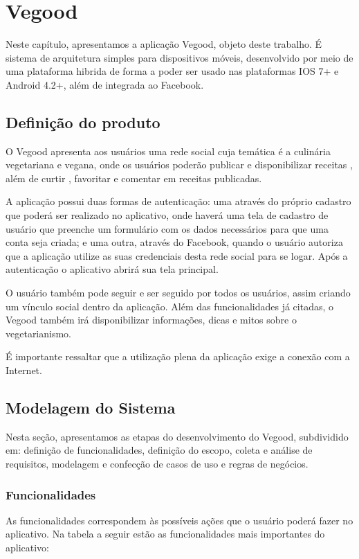 \chapter{Vegood} \label{cha:vegood}
Neste capítulo, apresentamos a aplicação Vegood, objeto deste trabalho. É sistema de arquitetura simples para dispositivos móveis, desenvolvido por meio de uma plataforma hibrida de forma a poder ser usado nas plataformas IOS 7+ e Android 4.2+, além  de integrada ao Facebook.

\section{Definição do produto} \label{sec:vegood:definicao}

O Vegood apresenta aos usuários uma rede social cuja temática é a culinária vegetariana e vegana, onde os usuários poderão publicar e disponibilizar receitas , além de  curtir , favoritar e comentar em receitas publicadas.

A aplicação possui duas formas de autenticação: uma através do próprio cadastro que poderá ser realizado no aplicativo, onde haverá uma tela de cadastro de usuário que preenche um formulário com os dados necessários para que uma conta seja criada; e uma outra, através do Facebook,  quando o usuário autoriza que a aplicação utilize as suas credenciais desta rede social para se logar. Após a autenticação o aplicativo abrirá sua tela principal.

O usuário também pode seguir e ser seguido por todos os usuários, assim criando um vínculo social dentro da aplicação. Além das funcionalidades já citadas, o Vegood também irá disponibilizar informações, dicas e mitos sobre o vegetarianismo. 

É importante ressaltar que a utilização plena da aplicação exige a conexão com a Internet.

\section{Modelagem do Sistema}
Nesta seção, apresentamos as etapas do desenvolvimento do Vegood, subdividido em: definição de funcionalidades, definição do escopo, coleta e análise de requisitos, modelagem e confecção de casos de uso e regras de negócios.

\subsection{Funcionalidades} \label{sec:vegood:Funcionalidades}
As funcionalidades correspondem às possíveis ações que o usuário poderá fazer no aplicativo. Na tabela a seguir estão as funcionalidades mais importantes do aplicativo:

